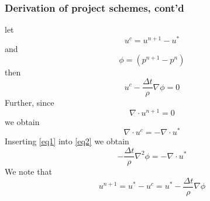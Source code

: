 \begin{frame}
\frametitle{Derivation of project schemes, cont'd}
let 
\[
u^c = u^{n+1} - u^* 
\]
and 
\[
\phi =  (p^{n+1} - p^n) 
\]
then 
\begin{equation}
\label{eq1}
u^c - \frac{\Delta t}{\rho} \nabla \phi = 0 
\end{equation}
Further, since
\[
\nabla \cdot u^{n+1} = 0 
\]
we obtain 
\begin{equation}
\label{eq2}
\nabla \cdot u^c = - \nabla \cdot u^* 
\end{equation}
Inserting \eqref{eq1} into \eqref{eq2} we obtain
\[
- \frac{\Delta t}{\rho} \nabla^2 \phi = -\nabla \cdot u^*  
\]
We note that 
\[
u^{n+1} = u^* - u^c =  u^*- \frac{\Delta t}{\rho} \nabla \phi 
\]
\end{frame}

